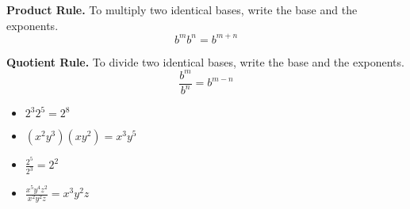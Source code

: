 \vspace{-0.5\onelineskip}
\begin{tcbraster}[
    raster columns = 2,
    raster equal height,
    colback = white,
    raster before skip = 0in, raster after skip = 0in,
]
\begin{tcolorbox}[]
    {\bfseries Product Rule.}
    To multiply two identical bases,
    write the base and  the exponents.
    \[b^m b^n = b^{m+n}\]
\end{tcolorbox}
\begin{tcolorbox}[]
    {\bfseries Quotient Rule.}
    To divide two identical bases,
    write the base and  the exponents.
    \[\frac{b^m}{b^n} = b^{m-n}\]
\end{tcolorbox}


\begin{tcolorbox}[enhanced,opacityframe=0,]
    \begin{itemize}
        \item $2^3 2^5 = 2^8$
        \item $(x^2 y^3) (xy^2) = x^3 y^5$
    \end{itemize}
    \end{tcolorbox}
    \begin{tcolorbox}[enhanced,opacityframe=0,]
        \begin{itemize}
            \item $\frac{2^5}{2^3} = 2^2$
            \item $\frac{x^5 y^4 z^2}{x^2 y^2 z} = x^3 y^2 z$
        \end{itemize}
    \end{tcolorbox}

\end{tcbraster}
